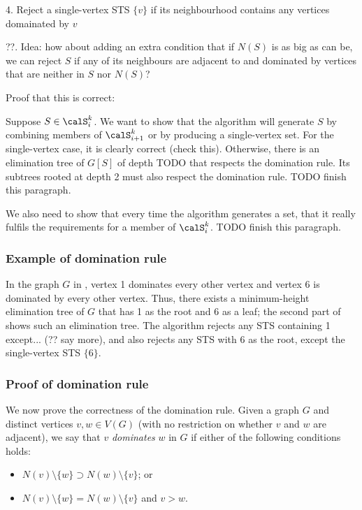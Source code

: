 4. Reject a single-vertex STS $\{v\}$ if its neighbourhood contains
   any vertices domainated by $v$

??. Idea: how about adding an extra condition that if $N(S)$ is as big
    as can be, we can reject $S$ if any of its neighbours are adjacent to
    and dominated by vertices that are neither in $S$ nor $N(S)$?

Proof that this is correct:

Suppose $S \in \calS_i^k$.  We want to show that the algorithm will
generate $S$ by combining members of $\calS_{i+1}^k$ or by producing
a single-vertex set.  For the single-vertex case, it is clearly correct
(check this).  Otherwise, there is an elimination tree of $G[S]$
of depth TODO that respects the domination rule.  Its subtrees rooted at
depth 2 must also respect the domination rule.  TODO finish this paragraph.

We also need to show that every time the algorithm generates a set,
that it really fulfils the requirements for a member of $\calS_i^k$.
TODO finish this paragraph.

\subsubsection{Example of domination rule}

In the graph $G$ in , vertex 1 dominates every other
vertex and vertex 6 is dominated by every other vertex.  Thus, there exists a
minimum-height elimination tree of $G$ that has 1 as the root and 6 as a leaf;
the second part of  shows such an elimination tree.
The algorithm rejects any STS containing 1 except... (?? say more), and also
rejects any STS with 6 as the root, except the single-vertex STS $\{6\}$.

\subsubsection{Proof of domination rule}

We now prove the correctness of the domination rule.
Given a graph $G$ and distinct vertices $v, w \in V(G)$
(with no restriction on whether $v$ and $w$ are adjacent),
we say that $v$ \emph{dominates} $w$
in $G$ if either of the following conditions holds:

\begin{itemize}
  \item $N(v) \setminus \{w\} \supset N(w) \setminus \{v\}$; or
  \item $N(v) \setminus \{w\} = N(w) \setminus \{v\}$ and $v > w$.
\end{itemize}

